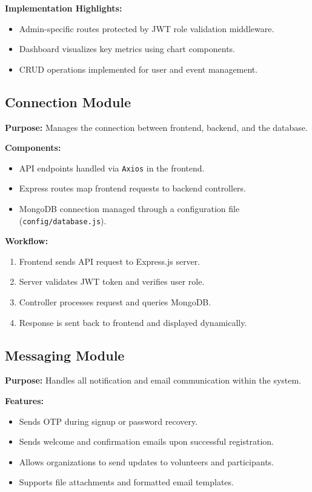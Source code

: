 \documentclass[12pt,a4paper]{report}
\begin{document}
\textbf{Implementation Highlights:}
\begin{itemize}
    \item Admin-specific routes protected by JWT role validation middleware.
    \item Dashboard visualizes key metrics using chart components.
    \item CRUD operations implemented for user and event management.
\end{itemize}

\subsection{Connection Module}

\textbf{Purpose:} Manages the connection between frontend, backend, and the database.

\textbf{Components:}
\begin{itemize}
    \item API endpoints handled via \texttt{Axios} in the frontend.
    \item Express routes map frontend requests to backend controllers.
    \item MongoDB connection managed through a configuration file (\texttt{config/database.js}).
\end{itemize}

\textbf{Workflow:}
\begin{enumerate}
    \item Frontend sends API request to Express.js server.
    \item Server validates JWT token and verifies user role.
    \item Controller processes request and queries MongoDB.
    \item Response is sent back to frontend and displayed dynamically.
\end{enumerate}

\subsection{Messaging Module}

\textbf{Purpose:} Handles all notification and email communication within the system.

\textbf{Features:}
\begin{itemize}
    \item Sends OTP during signup or password recovery.
    \item Sends welcome and confirmation emails upon successful registration.
    \item Allows organizations to send updates to volunteers and participants.
    \item Supports file attachments and formatted email templates.
\end{itemize}
\end{document}
